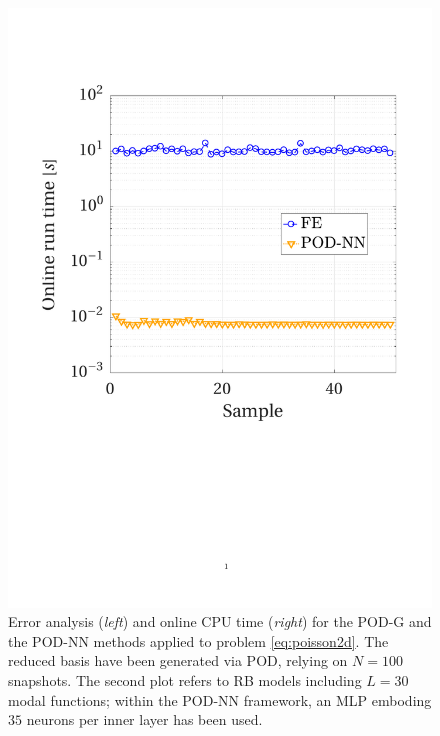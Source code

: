 \documentclass[longtitle]{elsarticle}
\numberwithin{equation}{section}
\theoremstyle{theorem}
\theoremstyle{definition}
\theoremstyle{remark}
\theoremstyle{proposition}
\numberwithin{figure}{section}
\begin{document}
\begin{figure}[t!]
			\includegraphics[scale = 0.38, trim = {1.5cm 8.95cm 1.5cm 3.8cm}, clip]{poisson2d_time}
			
			\vspace*{-0.1cm}
			
			\caption{Error analysis (\emph{left}) and online CPU time (\emph{right}) for the POD-G and the POD-NN methods applied to problem \eqref{eq:poisson2d}. The reduced basis have been generated via POD, relying on $N = 100$ snapshots. The second plot refers to RB models including $L = 30$ modal functions; within the POD-NN framework, an MLP emboding $35$ neurons per inner layer has been used.}
			\label{fig:poisson2d-fig3}
			
			\vspace*{0.3cm}
			

\end{figure}
\end{document}
